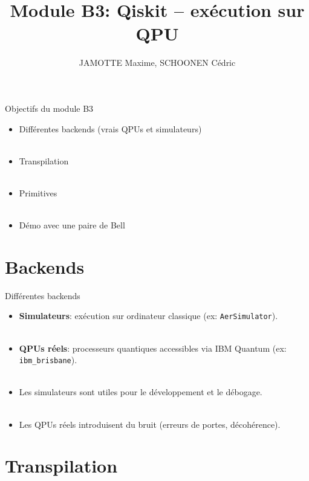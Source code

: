 \documentclass[aspectratio=169,12pt]{beamer}
\title[Module B3]{Module B3: Qiskit -- exécution sur QPU}
\author{JAMOTTE Maxime, SCHOONEN Cédric}
\institute{Digital Learning Hub}
\date{}
\begin{document}
\begin{frame}
  \titlepage
\end{frame}

\begin{frame}{Objectifs du module B3}
  \begin{itemize}
    \item Différentes backends (vrais QPUs et simulateurs)\\~\\
    \item Transpilation\\~\\
    \item Primitives\\~\\
    \item Démo avec une paire de Bell
  \end{itemize}
\end{frame}

\section{Backends}

\begin{frame}{Différentes backends}
  \begin{itemize}[<+->]
    \setlength{\itemsep}{0.8em}
    \item \textbf{Simulateurs}: exécution sur ordinateur classique (ex: \texttt{AerSimulator}).\\~\\
    \item \textbf{QPUs réels}: processeurs quantiques accessibles via IBM Quantum (ex: \texttt{ibm\_brisbane}).\\~\\
    \item Les simulateurs sont utiles pour le développement et le débogage.\\~\\
    \item Les QPUs réels introduisent du bruit (erreurs de portes, décohérence).
  \end{itemize}
\end{frame}

\section{Transpilation}
\end{document}
